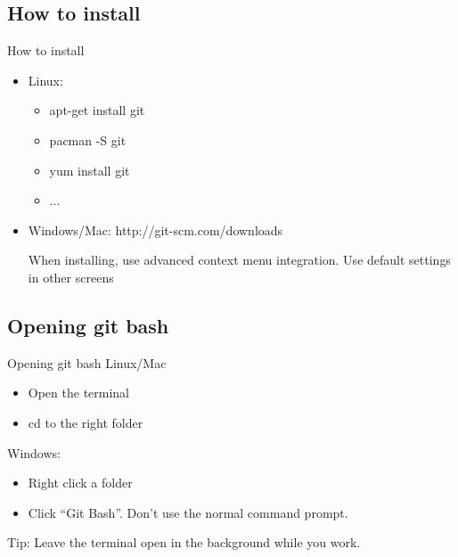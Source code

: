 \documentclass[10pt,a4paper]{beamer}
\begin{document}
\subsection{How to install}
\begin{frame}{How to install}
\begin{itemize}
\item Linux:
\begin{itemize}
\item apt-get install git
\item pacman -S git
\item yum install git
\item ...
\end{itemize}
\item Windows/Mac: http://git-scm.com/downloads

When installing, use advanced context menu integration. Use default settings in other screens
\end{itemize}
\end{frame}

\subsection{Opening git bash}
\begin{frame}{Opening git bash}
Linux/Mac
\begin{itemize}
\item Open the terminal
\item cd to the right folder
\end{itemize}

Windows:
\begin{itemize}
\item Right click a folder
\item Click ``Git Bash''. Don't use the normal command prompt.
\end{itemize}

Tip: Leave the terminal open in the background while you work.


\end{frame}
\end{document}
